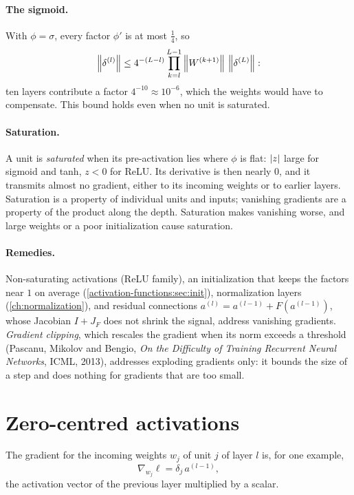 \begin{notechapter}
\paragraph{The sigmoid.} With $\phi = \sigma$, every factor $\phi'$ is at most $\frac14$, so
\[
  \left\|\delta^{(l)}\right\|\leq4^{-(L-l)}\prod_{k=l}^{L-1}\left\|W^{(k+1)}\right\|\,\left\|\delta^{(L)}\right\| :
\]
ten layers contribute a factor $4^{-10}\approx10^{-6}$, which the weights would have to compensate. This bound holds even when no unit is saturated.

\paragraph{Saturation.} A unit is \emph{saturated} when its pre-activation lies where $\phi$ is flat:
$\left|z\right|$ large for sigmoid and tanh, $z<0$ for ReLU. Its derivative is then nearly $0$, and it
transmits almost no gradient, either to its incoming weights or to earlier layers. Saturation
is a property of individual units and inputs; vanishing gradients are a property of the
product along the depth. Saturation makes vanishing worse, and large weights or a poor
initialization cause saturation.

\paragraph{Remedies.} Non-saturating activations (ReLU family), an initialization that
keeps the factors near $1$ on average (\cref{activation-functions:sec:init}), normalization
layers (\cref{ch:normalization}), and residual connections $a^{(l)} = a^{(l-1)} + F(a^{(l-1)})$, whose Jacobian
$I + J_F$ does not shrink the signal, address vanishing gradients. \emph{Gradient clipping},
which rescales the gradient when its norm exceeds a threshold (Pascanu, Mikolov and Bengio,
\emph{On the Difficulty of Training Recurrent Neural Networks}, ICML, 2013), addresses
exploding gradients only: it bounds the size of a step and does nothing for gradients that
are too small.

\section{Zero-centred activations}\label{activation-functions:sec:centred}

The gradient for the incoming weights $w_j$ of unit $j$ of layer $l$ is, for one example,
\[
  \nabla_{w_j}\ell = \delta_j\,a^{(l-1)},
\]
the activation vector of the previous layer multiplied by a scalar.


\end{notechapter}
